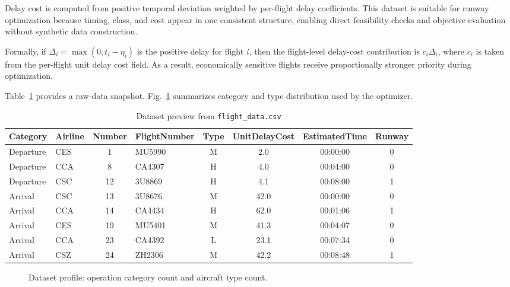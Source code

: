\documentclass[conference]{IEEEtran}
\begin{document}
Delay cost is computed from positive temporal deviation weighted by per-flight delay coefficients. This dataset is suitable for runway optimization because timing, class, and cost appear in one consistent structure, enabling direct feasibility checks and objective evaluation without synthetic data construction.

Formally, if $\Delta_i=\max(0,t_i-\eta_i)$ is the positive delay for flight $i$, then the flight-level delay-cost contribution is $c_i\Delta_i$, where $c_i$ is taken from the per-flight unit delay cost field. As a result, economically sensitive flights receive proportionally stronger priority during optimization.

Table~\ref{tab:datasetpreview} provides a raw-data snapshot. Fig.~\ref{fig:datasetprofile} summarizes category and type distribution used by the optimizer.

\begin{table}[t]
\centering
\caption{Dataset preview from \texttt{flight\_data.csv}}
\scriptsize
\begin{tabular}{l l c l c c c c}
\toprule
Category & Airline & Number & FlightNumber & Type & UnitDelayCost & EstimatedTime & Runway \\
\midrule
Departure & CES & 1 & MU5990 & M & 2.0 & 00:00:00 & 0 \\
Departure & CCA & 8 & CA4307 & H & 4.0 & 00:04:00 & 0 \\
Departure & CSC & 12 & 3U8869 & H & 4.1 & 00:08:00 & 1 \\
Arrival & CSC & 13 & 3U8676 & M & 42.0 & 00:00:00 & 0 \\
Arrival & CCA & 14 & CA4434 & H & 62.0 & 00:01:06 & 1 \\
Arrival & CES & 19 & MU5401 & M & 41.3 & 00:04:07 & 0 \\
Arrival & CCA & 23 & CA4392 & L & 23.1 & 00:07:34 & 0 \\
Arrival & CSZ & 24 & ZH2306 & M & 42.2 & 00:08:48 & 1 \\
\bottomrule
\end{tabular}
\label{tab:datasetpreview}
\end{table}

\begin{figure}[htbp]
\centering
{}
\caption{Dataset profile: operation category count and aircraft type count.}
\label{fig:datasetprofile}
\end{figure}
\end{document}
